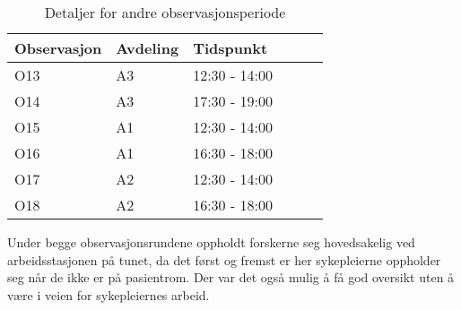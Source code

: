 \begin{table}[H]\centering
    \begin{tabular}{ |l|l|l|l|l|l| }
    \hline
    Observasjon & Avdeling & Tidspunkt \\ \hline
       O13 & A3 & 12:30 - 14:00 \\ \hline
       O14 & A3 & 17:30 - 19:00 \\ \hline
      O15 & A1 & 12:30 - 14:00 \\ \hline
       O16 & A1 & 16:30 - 18:00 \\ \hline
         O17 & A2 & 12:30 - 14:00 \\ \hline
       O18 & A2 & 16:30 - 18:00 \\ \hline
    \end{tabular}
    \caption {Detaljer for andre observasjonsperiode}
    \label{detaljer2}
\end{table}

\noindent 
Under begge observasjonsrundene oppholdt forskerne seg hovedsakelig ved arbeidsstasjonen på tunet, da det først og fremst er her sykepleierne oppholder seg når de ikke er på pasientrom. Der var det også mulig å få god oversikt uten å være i veien for sykepleiernes arbeid.
 